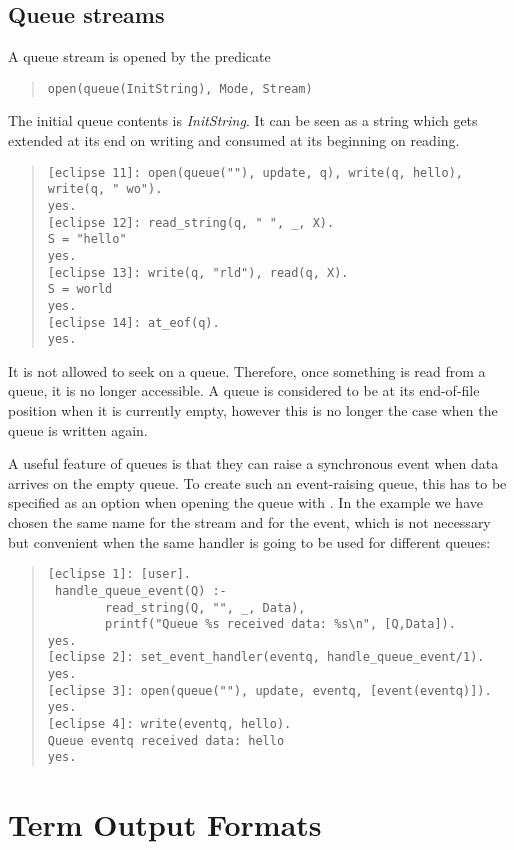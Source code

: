 \subsection{Queue streams}
\label{queueio}
A queue stream is opened by the  predicate
\begin{quote}\begin{verbatim}
open(queue(InitString), Mode, Stream)
\end{verbatim}\end{quote}
The initial queue contents is {\it InitString}.
It can be seen as a string which gets extended at its end on writing
and consumed at its beginning on reading.
\begin{quote}\begin{verbatim}
[eclipse 11]: open(queue(""), update, q), write(q, hello), write(q, " wo").
yes.
[eclipse 12]: read_string(q, " ", _, X).
S = "hello"
yes.
[eclipse 13]: write(q, "rld"), read(q, X).
S = world
yes.
[eclipse 14]: at_eof(q).
yes.
\end{verbatim}\end{quote} 
It is not allowed to seek on a queue. Therefore, once something is read
from a queue, it is no longer accessible. A queue is considered to be
at its end-of-file position when it is currently empty, however this
is no longer the case when the queue is written again.

A useful feature of queues is that they can raise a synchronous event
when data arrives on the empty queue. To create such an event-raising
queue, this has to be specified as an option when opening the queue with
.
In the example we have chosen the same name for the stream and for the
event, which is not necessary but convenient when the same handler
is going to be used for different queues:
\begin{quote}\begin{verbatim}
[eclipse 1]: [user].
 handle_queue_event(Q) :-  
        read_string(Q, "", _, Data),
        printf("Queue %s received data: %s\n", [Q,Data]).
yes.
[eclipse 2]: set_event_handler(eventq, handle_queue_event/1).
yes.
[eclipse 3]: open(queue(""), update, eventq, [event(eventq)]).
yes.
[eclipse 4]: write(eventq, hello).
Queue eventq received data: hello
yes.
\end{verbatim}\end{quote} 


\section{Term Output Formats}
\label{secoutputformats}

